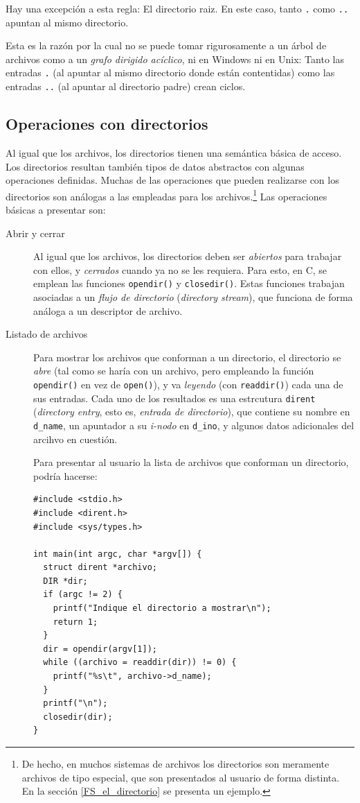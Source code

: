 \documentclass[11pt,fleqn]{book} %
\begin{document}
Hay una excepción a esta regla: El directorio raiz. En este caso,
tanto \texttt{.} como \texttt{..} apuntan al mismo directorio.

Esta es la razón por la cual no se puede tomar rigurosamente a un
árbol de archivos como a un \emph{grafo dirigido acíclico}, ni en Windows
ni en Unix: Tanto las entradas \texttt{.} (al apuntar al mismo directorio
donde están contentidas) como las entradas \texttt{..} (al apuntar al
directorio padre) crean ciclos.
\subsection{Operaciones con directorios}
\label{sec-6-3-2}
\label{DIR_oper_dirs}

Al igual que los archivos, los directorios tienen una semántica básica
de acceso. Los directorios resultan también tipos de datos abstractos
con algunas operaciones definidas. Muchas de las operaciones que
pueden realizarse con los directorios son análogas a las empleadas
para los archivos.\footnote{De hecho, en muchos sistemas de archivos los
directorios son meramente archivos de tipo especial, que son
presentados al usuario de forma distinta. En la sección
\ref{FS_el_directorio} se presenta un ejemplo. } Las operaciones
básicas a presentar son:

\begin{description}
\item[Abrir y cerrar] Al igual que los archivos, los directorios deben
     ser \emph{abiertos} para trabajar con ellos, y \emph{cerrados} cuando ya no
     se les requiera. Para esto, en C, se emplean las funciones
     \texttt{opendir()} y \texttt{closedir()}. Estas funciones trabajan asociadas a
     un \emph{flujo de directorio} (\emph{directory stream}), que funciona de
     forma análoga a un descriptor de archivo.
\item[Listado de archivos] Para mostrar los archivos que conforman a un
     directorio, el directorio se \emph{abre} (tal como se haría con un
     archivo, pero empleando la función \texttt{opendir()} en vez de
     \texttt{open()}), y va \emph{leyendo} (con \texttt{readdir()}) cada una de sus entradas.
     Cada uno de los resultados es una estrcutura \texttt{dirent}
     (\emph{directory entry}, esto es, \emph{entrada de directorio}), que
     contiene su nombre en \texttt{d\_name}, un apuntador a su \emph{i-nodo} en
     \texttt{d\_ino}, y algunos datos adicionales del arcihvo en cuestión.

     Para presentar al usuario la lista de archivos que conforman un
     directorio, podría hacerse:


\begin{verbatim}
#include <stdio.h>
#include <dirent.h>
#include <sys/types.h>

int main(int argc, char *argv[]) {
  struct dirent *archivo;
  DIR *dir;
  if (argc != 2) {
    printf("Indique el directorio a mostrar\n");
    return 1;
  }
  dir = opendir(argv[1]);
  while ((archivo = readdir(dir)) != 0) {
    printf("%s\t", archivo->d_name);
  }
  printf("\n");
  closedir(dir);
}
\end{verbatim}
\end{description}
\end{document}
